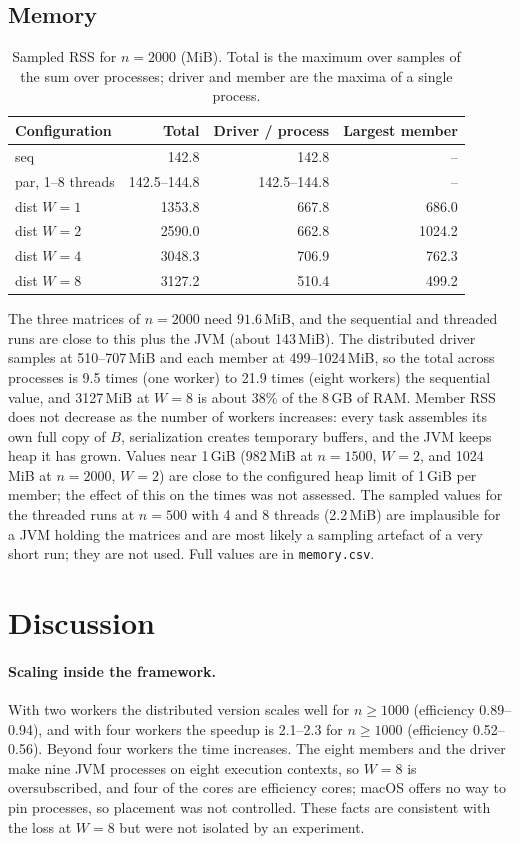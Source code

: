\documentclass[11pt,a4paper]{article}
\begin{document}
\subsection{Memory}
\begin{table}[H]
\centering
\caption{Sampled RSS for $n=2000$ (MiB). Total is the maximum over samples of the sum over processes; driver and member are the maxima of a single process.}
\small
\begin{tabular}{@{}lrrr@{}}
\toprule
Configuration & Total & Driver / process & Largest member \\
\midrule
seq              & 142.8 & 142.8 & -- \\
par, 1--8 threads & 142.5--144.8 & 142.5--144.8 & -- \\
dist $W=1$       & 1353.8 & 667.8 & 686.0 \\
dist $W=2$       & 2590.0 & 662.8 & 1024.2 \\
dist $W=4$       & 3048.3 & 706.9 & 762.3 \\
dist $W=8$       & 3127.2 & 510.4 & 499.2 \\
\bottomrule
\end{tabular}
\end{table}
The three matrices of $n=2000$ need $91.6$\,MiB, and the sequential and threaded runs are
close to this plus the JVM (about 143\,MiB). The distributed driver samples at 510--707\,MiB
and each member at 499--1024\,MiB, so the total across processes is 9.5 times (one worker)
to 21.9 times (eight workers) the sequential value, and 3127\,MiB at $W=8$ is about 38\% of
the 8\,GB of RAM. Member RSS does not decrease as the number of workers increases: every task
assembles its own full copy of $B$, serialization creates temporary buffers, and the JVM
keeps heap it has grown. Values near 1\,GiB (982\,MiB at $n=1500$, $W=2$, and 1024\,MiB at
$n=2000$, $W=2$) are close to the configured heap limit of 1\,GiB per member; the effect
of this on the times was not assessed. The sampled values for the threaded runs at $n=500$
with 4 and 8 threads (2.2\,MiB) are implausible for a JVM holding the matrices and are most
likely a sampling artefact of a very short run; they are not used. Full values are in
\texttt{memory.csv}.

\section{Discussion}
\paragraph{Scaling inside the framework.} With two workers the distributed version scales
well for $n\ge1000$ (efficiency 0.89--0.94), and with four workers the speedup is 2.1--2.3
for $n\ge1000$ (efficiency 0.52--0.56). Beyond four workers the time increases. The eight
members and the driver make nine JVM processes on eight execution contexts, so $W=8$ is
oversubscribed, and four of the cores are efficiency cores; macOS offers no way to pin
processes, so placement was not controlled. These facts are consistent with the loss at
$W=8$ but were not isolated by an experiment.
\end{document}
